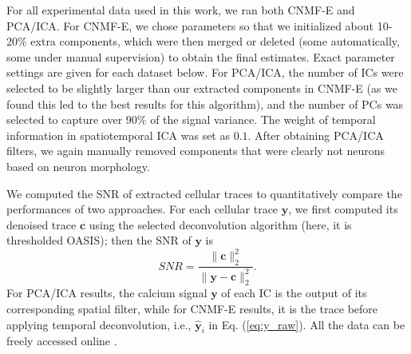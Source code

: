 \documentclass[9pt,lineno]{elife}
\begin{document}
For all experimental data used in this work, we ran both CNMF-E and PCA/ICA. For CNMF-E, we chose parameters so that we initialized about 10-20\% extra components, which were then merged or deleted (some automatically, some under manual supervision) to obtain the final estimates.  Exact parameter settings are given for each dataset below.  For PCA/ICA, the number of ICs were selected to be slightly larger than our extracted components in CNMF-E (as we found this led to the best results for this algorithm), and the number of PCs was selected to capture over $90\%$ of the signal variance. The weight of temporal information in spatiotemporal ICA was set as $0.1$. After obtaining PCA/ICA filters, we again manually removed components that were clearly not neurons based on neuron morphology.  

We computed the SNR of extracted cellular traces to  quantitatively compare the performances of two approaches. For each cellular trace $\bm{y}$, we first computed its denoised trace $\bm{c}$ using the selected deconvolution algorithm (here, it is thresholded OASIS); then the SNR of $\bm{y}$ is 
\begin{equation}
SNR = \frac{\|\bm{c}\|_2^2}{\|\bm{y}-\bm{c}\|_2^2}. 
\end{equation}
For PCA/ICA results, the calcium signal $\bm{y}$ of each IC is the output of its corresponding spatial filter, while for CNMF-E results, it is the trace before applying temporal deconvolution, i.e., $\hat{\bm{y}}_i$ in Eq. (\ref{eq:y_raw}). 
All the data can be freely accessed online \cite{Zhou2017data}.
\end{document}
